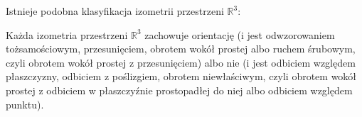 Istnieje podobna klasyfikacja izometrii przestrzeni $\mathbb R^3$:

\begin{proposition}
        Każda izometria przestrzeni $\mathbb R^3$ zachowuje orientację (i jest odwzorowaniem tożsamościowym, przesunięciem, obrotem wokół prostej albo ruchem śrubowym, czyli obrotem wokół prostej z przesunięciem) albo nie (i jest odbiciem względem płaszczyzny, odbiciem z poślizgiem, obrotem niewłaściwym, czyli obrotem wokół prostej z odbiciem w płaszczyźnie prostopadłej do niej albo odbiciem względem punktu).
\end{proposition}
